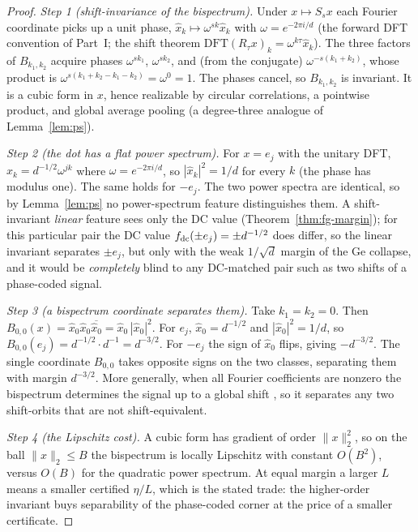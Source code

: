 \begin{proof}
\emph{Step 1 (shift-invariance of the bispectrum).}
Under $x \mapsto S_s x$ each Fourier coordinate picks up a unit phase, $\hat x_k \mapsto \omega^{sk}\hat
x_k$ with $\omega = e^{-2\pi i/d}$ (the forward DFT convention of Part~I; the shift theorem
$\mathrm{DFT}(R_\tau x)_k = \omega^{k\tau}\hat x_k$). The three factors of $B_{k_1,k_2}$ acquire phases $\omega^{s k_1}$,
$\omega^{s k_2}$, and (from the conjugate) $\omega^{-s(k_1+k_2)}$, whose product is
$\omega^{s(k_1 + k_2 - k_1 - k_2)} = \omega^0 = 1$. The phases cancel, so $B_{k_1,k_2}$ is invariant.
It is a cubic form in $x$, hence realizable by circular correlations, a pointwise product, and global
average pooling (a degree-three analogue of Lemma~\ref{lem:ps}).

\emph{Step 2 (the dot has a flat power spectrum).}
For $x = e_j$ with the unitary DFT, $\hat x_k = d^{-1/2}\omega^{jk}$ where $\omega = e^{-2\pi i/d}$, so
$|\hat x_k|^2 = 1/d$ for every $k$ (the phase has modulus one). The same holds for $-e_j$. The two
power spectra are identical, so by Lemma~\ref{lem:ps} no power-spectrum feature distinguishes them.
A shift-invariant \emph{linear} feature sees only the DC value (Theorem~\ref{thm:fg-margin}); for this
particular pair the DC value $f_{\mathrm{dc}}(\pm e_j) = \pm d^{-1/2}$ does differ, so the linear invariant
separates $\pm e_j$, but only with the weak $1/\sqrt d$ margin of the Ge collapse, and it would be
\emph{completely} blind to any DC-matched pair such as two shifts of a phase-coded signal.

\emph{Step 3 (a bispectrum coordinate separates them).}
Take $k_1 = k_2 = 0$. Then $B_{0,0}(x) = \hat x_0 \hat x_0 \overline{\hat x_0} = \hat x_0\,|\hat x_0|^2$.
For $e_j$, $\hat x_0 = d^{-1/2}$ and $|\hat x_0|^2 = 1/d$, so $B_{0,0}(e_j) = d^{-1/2}\cdot d^{-1} =
d^{-3/2}$. For $-e_j$ the sign of $\hat x_0$ flips, giving $-d^{-3/2}$. The single coordinate
$B_{0,0}$ takes opposite signs on the two classes, separating them with margin $d^{-3/2}$. More
generally, when all Fourier coefficients are nonzero the bispectrum determines the signal up to a
global shift \citep{invariants_kakarala}, so it separates any two shift-orbits that are not
shift-equivalent.

\emph{Step 4 (the Lipschitz cost).}
A cubic form has gradient of order $\|x\|_2^2$, so on the ball $\|x\|_2 \le B$ the bispectrum is
locally Lipschitz with constant $O(B^2)$, versus $O(B)$ for the quadratic power spectrum. At equal
margin a larger $L$ means a smaller certified $\eta/L$, which is the stated trade: the higher-order
invariant buys separability of the phase-coded corner at the price of a smaller certificate.
\end{proof}

